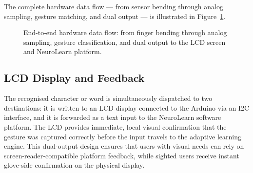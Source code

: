 The complete hardware data flow — from sensor bending through analog sampling, gesture matching, and dual output — is illustrated in Figure~\ref{fig:hardware_flow}.

\begin{figure}[h]
	\centering
	\caption{End-to-end hardware data flow: from finger bending through analog sampling, gesture classification, and dual output to the LCD screen and NeuroLearn platform.}
	\label{fig:hardware_flow}
\end{figure}

\subsection{LCD Display and Feedback}

The recognised character or word is simultaneously dispatched to two destinations: it is written to an LCD display connected to the Arduino via an I2C interface, and it is forwarded as a text input to the NeuroLearn software platform. The LCD provides immediate, local visual confirmation that the gesture was captured correctly before the input travels to the adaptive learning engine. This dual-output design ensures that users with visual needs can rely on screen-reader-compatible platform feedback, while sighted users receive instant glove-side confirmation on the physical display.

